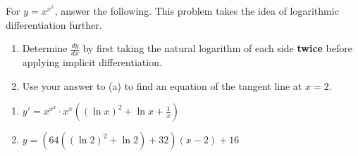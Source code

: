 {For $y=x^{x^x}$, answer the following.  This problem takes the idea of logarithmic differentiation further.
\begin{enumerate}
\item	Determine $\frac{dy}{dx}$ by first taking the natural logarithm of each side \textbf{twice} before applying implicit differentiation.
\item   Use your answer to (a) to find an equation of the tangent line at $x=2$.
\end{enumerate}
}
{\begin{enumerate}
\item $y'=x^{x^x}\cdot x^x \left((\ln x)^2+\ln x+\frac{1}{x}\right)$
\item $y=\left(64\left((\ln 2)^2+\ln 2\right)+32\right)(x-2)+16$
\end{enumerate}
}
